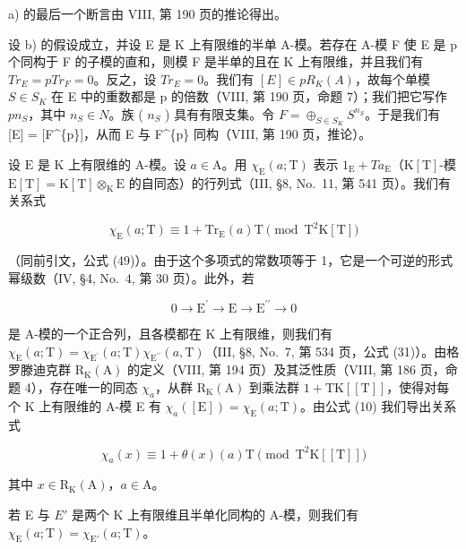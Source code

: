a) 的最后一个断言由 VIII, 第 190 页的推论得出。

设 b) 的假设成立，并设 E 是 K 上有限维的半单 A-模。若存在 A-模 F 使 E 是 p 个同构于 F 的子模的直和，则模 F 是半单的且在 K 上有限维，并且我们有 \(Tr_{E} = p Tr_{F} = 0\)。反之，设 \(Tr_{E} = 0\)。我们有 \([E] \in p R_{K}(A)\)，故每个单模 \(S \in S_{K}\) 在 E 中的重数都是 p 的倍数（VIII, 第 190 页，命题 7）；我们把它写作 \(pn_{S}\)，其中 \(n_{S} \in N\)。族 ( \(n_{S}\) ) 具有有限支集。令 \(F = \oplus_{S \in S_{K}} S^{n_{S}}\)。于是我们有 {[}E{]} = {[}F\^{}\{p\}{]}，从而 E 与 F\^{}\{p\} 同构（VIII, 第 190 页，推论）。

设 \(\mathrm{E}\) 是 \(\mathrm{K}\) 上有限维的 A-模。设 \(a \in \mathrm{A}\)。用 \(\chi_{\mathrm{E}}(a; \mathrm{T})\) 表示 \(1_{\mathrm{E}} + T a_{\mathrm{E}}\)（\(\mathrm{K}[\mathrm{T}]\)-模 \(\mathrm{E}[\mathrm{T}] = \mathrm{K}[\mathrm{T}] \otimes_{\mathrm{K}} \mathrm{E}\) 的自同态）的行列式（III, §8, No.~11, 第 541 页）。我们有关系式

\[
\chi_ {\mathrm{E}} (a; \mathrm{T}) \equiv 1 + \mathrm{Tr} _ {\mathrm{E}} (a) \mathrm{T} \pmod {\mathrm{T} ^ {2} \mathrm{K} [ \mathrm{T} ]}\tag{10}
\]

（同前引文，公式 (49)）。由于这个多项式的常数项等于 1，它是一个可逆的形式幂级数（IV, §4, No.~4, 第 30 页）。此外，若

\[
0 \longrightarrow \mathrm{E} ^ {\prime} \longrightarrow \mathrm{E} \longrightarrow \mathrm{E} ^ {\prime \prime} \longrightarrow 0
\]

是 A-模的一个正合列，且各模都在 K 上有限维，则我们有 \(\chi_{\mathrm{E}}(a;\mathrm{T})=\chi_{\mathrm{E}^{\prime}}(a;\mathrm{T})\chi_{\mathrm{E}^{\prime\prime}}(a,\mathrm{T})\)（III, §8, No.~7, 第 534 页，公式 (31)）。由格罗滕迪克群 \(\mathrm{R}_{\mathrm{K}}(\mathrm{A})\) 的定义（VIII, 第 194 页）及其泛性质（VIII, 第 186 页，命题 4），存在唯一的同态 \(\chi_{a}\)，从群 \(\mathrm{R}_{\mathrm{K}}(\mathrm{A})\) 到乘法群 \(1+\mathrm{TK}[[\mathrm{T}]]\)，使得对每个 K 上有限维的 A-模 E 有 \(\chi_{a}([\mathrm{E}])=\chi_{\mathrm{E}}(a;\mathrm{T})\)。由公式 (10) 我们导出关系式

\[
\chi_ {a} (x) \equiv 1 + \theta (x) (a) \mathrm{T} \pmod {\mathrm{T} ^ {2} \mathrm{K} [ [ \mathrm{T} ] ]}\tag{11}
\]

其中 \(x\in \mathrm{R}_{\mathrm{K}}(\mathrm{A})\)，\(a\in \mathrm{A}\)。

若 E 与 \(E'\) 是两个 K 上有限维且半单化同构的 A-模，则我们有 \(\chi_{\mathrm{E}}(a;\mathrm{T})=\chi_{\mathrm{E}'}(a;\mathrm{T})\)。


